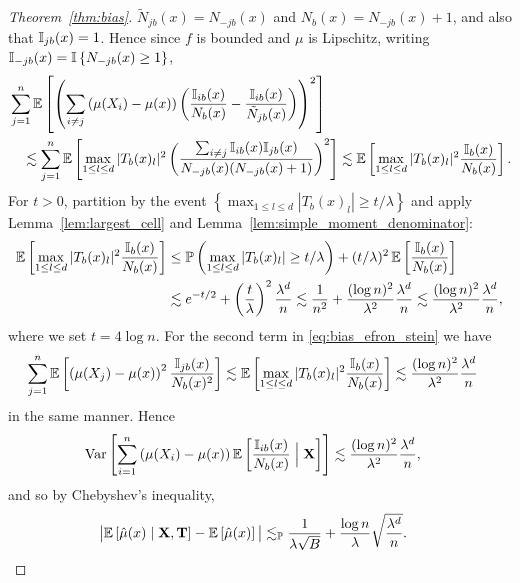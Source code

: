 \begin{proof}[Theorem~\ref{thm:bias}]
  $\tilde N_{j b}(x) = N_{-j b}(x)$ and $N_b(x) = N_{-j b}(x) + 1$,
  and also that $\mathbb{I}_{j b}(x) = 1$.
  Hence since $f$ is bounded and $\mu$ is Lipschitz,
  writing $\mathbb{I}_{-j b}(x) = \mathbb{I} \left\{ N_{-j b}(x) \geq 1 \right\}$,
  \begin{align*}
    &\sum_{j=1}^{n}
    \mathbb{E} \left[
      \left(
        \sum_{i \neq j}
        \left( \mu(X_i) - \mu(x) \right)
        \left(
          \frac{\mathbb{I}_{i b}(x)}{N_b(x)} - \frac{\mathbb{I}_{i b}(x)}{\tilde N_{j b}(x)}
        \right)
      \right)^2
    \right] \\
    &\quad\lesssim
    \sum_{j=1}^{n}
    \mathbb{E} \left[
      \max_{1 \leq l \leq d}
      |T_b(x)_l|^2
      \left(
        \frac{\sum_{i \neq j}\mathbb{I}_{i b}(x) \mathbb{I}_{j b}(x)}
        {N_{-j b}(x)(N_{-j b}(x) + 1)}
      \right)^2
    \right]
    \lesssim
    \mathbb{E} \left[
      \max_{1 \leq l \leq d}
      |T_b(x)_l|^2
      \frac{\mathbb{I}_{b}(x)}{N_{b}(x)}
    \right].
  \end{align*}
  For $t > 0$, partition by the event
  $\left\{ \max_{1 \leq l \leq d} |T_b(x)_l| \geq t/\lambda \right\}$
  and apply Lemma~\ref{lem:largest_cell} and
  Lemma~\ref{lem:simple_moment_denominator}:
  \begin{align*}
    \mathbb{E} \left[
      \max_{1 \leq l \leq d}
      |T_b(x)_l|^2
      \frac{\mathbb{I}_{b}(x)}{N_{b}(x)}
    \right]
    &\leq
    \mathbb{P} \left(
      \max_{1 \leq l \leq d} |T_b(x)_l| \geq t/\lambda
    \right)
    + (t / \lambda)^2\,
    \mathbb{E} \left[
      \frac{\mathbb{I}_{b}(x)}{N_{b}(x)}
    \right] \\
    &\lesssim
    e^{-t/2}
    + \left( \frac{t}{\lambda} \right)^2
    \frac{\lambda^d}{n}
    \lesssim
    \frac{1}{n^2}
    + \frac{(\log n)^2}{\lambda^2}
    \frac{\lambda^d}{n}
    \lesssim
    \frac{(\log n)^2}{\lambda^2}
    \frac{\lambda^{d}}{n},
  \end{align*}
  where we set $t = 4 \log n$.
  For the second term in \eqref{eq:bias_efron_stein} we have
  \begin{align*}
    \sum_{j=1}^{n}
    \mathbb{E} \left[
      \left( \mu(X_j) - \mu(x) \right)^2
      \frac{\mathbb{I}_{j b}(x)}{N_b(x)^2}
    \right]
    &\lesssim
    \mathbb{E} \left[
      \max_{1 \leq l \leq d}
      |T_b(x)_l|^{2}
      \frac{\mathbb{I}_{b}(x)}{N_b(x)}
    \right]
    \lesssim
    \frac{(\log n)^2}{\lambda^2}
    \frac{\lambda^{d}}{n}
  \end{align*}
  in the same manner.
  Hence
  \begin{align*}
    \operatorname{Var} \left[
      \sum_{i=1}^{n}
      \left( \mu(X_i) - \mu(x) \right)
      \mathbb{E} \left[
        \frac{\mathbb{I}_{i b}(x)}{N_b(x)}
        \Bigm| \mathbf{X}
      \right]
    \right]
    &\lesssim
    \frac{(\log n)^2}{\lambda^2}
    \frac{\lambda^{d}}{n},
  \end{align*}
  and so by Chebyshev's inequality,
  \begin{align*}
    \big|
    \mathbb{E} \left[ \hat \mu(x) \mid \mathbf{X}, \mathbf{T} \right]
    - \mathbb{E} \left[ \hat \mu(x) \right]
    \big|
    &\lesssim_{\mathbb{P}}
    \frac{1}{\lambda \sqrt B}
    + \frac{\log n}{\lambda}
    \sqrt{ \frac{\lambda^{d}}{n} }.
  \end{align*}


\end{proof}
